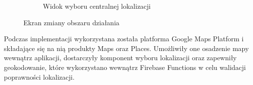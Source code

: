\begin{figure}[ht]
\begin{subfigure}{0.32\textwidth}
    \caption{Widok wyboru centralnej lokalizacji}
  \end{subfigure}
  \caption{Ekran zmiany obszaru działania}
  \label{fig:location}
\end{figure}


Podczas implementacji wykorzystana została platforma Google Maps Platform i składające się na nią produkty Maps oraz Places. Umożliwiły one osadzenie mapy wewnątrz aplikacji, dostarczyły komponent wyboru lokalizacji oraz zapewniły geokodowanie, które wykorzystano wewnątrz Firebase Functions w celu walidacji poprawności lokalizacji. 